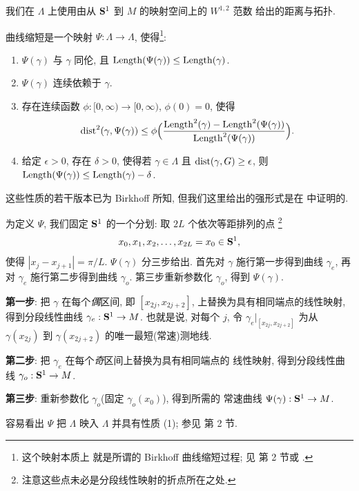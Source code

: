 我们在 $\Lambda$ 上使用由从 $\mathbf{S}^1$ 到 $M$ 的映射空间上的 $W^{1,2}$ 范数
给出的距离与拓扑.

曲线缩短是一个映射 $\Psi:\Lambda\to\Lambda$, 使得\footnote{这个映射本质上
就是所谓的 Birkhoff 曲线缩短过程; 见 \cite{Cr} 第 2 节或 \cite{CM28}.}:

\begin{enumerate}
\item $\Psi(\gamma)$ 与 $\gamma$ 同伦, 且
      $\operatorname{Length}(\Psi(\gamma))\leq\operatorname{Length}(\gamma)$.
\item $\Psi(\gamma)$ 连续依赖于 $\gamma$.
\item 存在连续函数 $\phi:[0,\infty)\to[0,\infty)$, $\phi(0)=0$, 使得
\begin{equation*}
\operatorname{dist}^2(\gamma,\Psi(\gamma))
\leq\phi\Bigl(\frac{\operatorname{Length}^2(\gamma)-\operatorname{Length}^2(\Psi(\gamma))}
{\operatorname{Length}^2(\Psi(\gamma))}\Bigr).
\end{equation*}
\item 给定 $\epsilon>0$, 存在 $\delta>0$, 使得若 $\gamma\in\Lambda$ 且
      $\operatorname{dist}(\gamma,G)\geq\epsilon$, 则
      $\operatorname{Length}(\Psi(\gamma))\leq\operatorname{Length}(\gamma)-\delta$.
\end{enumerate}

这些性质的若干版本已为 Birkhoff 所知, 但我们这里给出的强形式是在
\cite{CM28} 中证明的.

为定义 $\Psi$, 我们固定 $\mathbf{S}^1$ 的一个分划: 取 $2L$ 个依次等距排列的点%
\footnote{注意这些点未必是分段线性映射的折点所在之处.}
\begin{equation}
x_0,x_1,x_2,\dots,x_{2L}=x_0\in\mathbf{S}^1,
\label{eq:5.2}
\end{equation}
使得 $|x_j-x_{j+1}|=\pi/L$. $\Psi(\gamma)$ 分三步给出. 首先对 $\gamma$
施行第一步得到曲线 $\gamma_e$, 再对 $\gamma_e$ 施行第二步得到曲线
$\gamma_o$. 第三步重新参数化 $\gamma_o$, 得到 $\Psi(\gamma)$.

\textbf{第一步}: 把 $\gamma$ 在每个\emph{偶}区间, 即 $[x_{2j},x_{2j+2}]$,
上替换为具有相同端点的线性映射, 得到分段线性曲线 $\gamma_e:\mathbf{S}^1\to M$.
也就是说, 对每个 $j$, 令 $\gamma_e|_{[x_{2j},x_{2j+2}]}$ 为从
$\gamma(x_{2j})$ 到 $\gamma(x_{2j+2})$ 的唯一最短(常速)测地线.

\textbf{第二步}: 把 $\gamma_e$ 在每个\emph{奇}区间上替换为具有相同端点的
线性映射, 得到分段线性曲线 $\gamma_o:\mathbf{S}^1\to M$.

\textbf{第三步}: 重新参数化 $\gamma_o$(固定 $\gamma_o(x_0)$), 得到所需的
常速曲线 $\Psi(\gamma):\mathbf{S}^1\to M$.

容易看出 $\Psi$ 把 $\Lambda$ 映入 $\Lambda$ 并具有性质 (1); 参见 \cite{Cr}
第 2 节.

